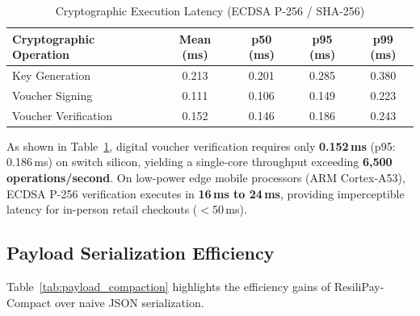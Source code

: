 \documentclass[conference]{IEEEtran}
\begin{document}
\begin{table}[htbp]
\caption{Cryptographic Execution Latency (ECDSA P-256 / SHA-256)}
\begin{center}
\begin{tabular}{lcccc}
\toprule
\textbf{Cryptographic Operation} & \textbf{Mean (ms)} & \textbf{p50 (ms)} & \textbf{p95 (ms)} & \textbf{p99 (ms)} \\
\midrule
Key Generation & 0.213 & 0.201 & 0.285 & 0.380 \\
Voucher Signing & 0.111 & 0.106 & 0.149 & 0.223 \\
Voucher Verification & 0.152 & 0.146 & 0.186 & 0.243 \\
\bottomrule
\end{tabular}
\label{tab:crypto_latencies}
\end{center}
\end{table}

As shown in Table~\ref{tab:crypto_latencies}, digital voucher verification requires only \textbf{0.152\,ms} (p95: 0.186\,ms) on switch silicon, yielding a single-core throughput exceeding \textbf{6,500 operations/second}. On low-power edge mobile processors (ARM Cortex-A53), ECDSA P-256 verification executes in \textbf{16\,ms to 24\,ms}, providing imperceptible latency for in-person retail checkouts ($<$50\,ms).

\subsection{Payload Serialization Efficiency}
Table~\ref{tab:payload_compaction} highlights the efficiency gains of ResiliPay-Compact over naive JSON serialization.

\begin{table}[htbp]
\caption{Payload Serialization \& Transmission Footprint}
\begin{center}
\label{tab:payload_compaction}
\end{center}
\end{table}
\end{document}
